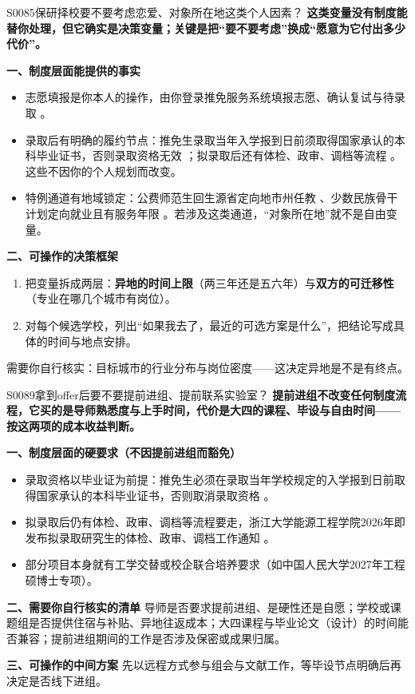 \begin{qa}{S0085}{保研择校要不要考虑恋爱、对象所在地这类个人因素？}
\textbf{这类变量没有制度能替你处理，但它确实是决策变量；关键是把“要不要考虑”换成“愿意为它付出多少代价”。}

\textbf{一、制度层面能提供的事实}
\begin{itemize}
  \item 志愿填报是你本人的操作，由你登录推免服务系统填报志愿、确认复试与待录取 。
  \item 录取后有明确的履约节点：推免生录取当年入学报到日前须取得国家承认的本科毕业证书，否则录取资格无效 ；拟录取后还有体检、政审、调档等流程 。这些不因你的个人规划而改变。
  \item 特例通道有地域锁定：公费师范生回生源省定向地市州任教 、少数民族骨干计划定向就业且有服务年限 。若涉及这类通道，“对象所在地”就不是自由变量。
\end{itemize}

\textbf{二、可操作的决策框架}
\begin{enumerate}
  \item 把变量拆成两层：\textbf{异地的时间上限}（两三年还是五六年）与\textbf{双方的可迁移性}（专业在哪几个城市有岗位）。
  \item 对每个候选学校，列出“如果我去了，最近的可选方案是什么”，把结论写成具体的时间与地点安排。
\end{enumerate}

需要你自行核实：目标城市的行业分布与岗位密度——这决定异地是不是有终点。
\end{qa}

\begin{qa}{S0089}{拿到offer后要不要提前进组、提前联系实验室？}
\textbf{提前进组不改变任何制度流程，它买的是导师熟悉度与上手时间，代价是大四的课程、毕设与自由时间——按这两项的成本收益判断。}

\textbf{一、制度层面的硬要求（不因提前进组而豁免）}
\begin{itemize}
  \item 录取资格以毕业证为前提：推免生必须在录取当年学校规定的入学报到日前取得国家承认的本科毕业证书，否则取消录取资格 。
  \item 拟录取后仍有体检、政审、调档等流程要走，浙江大学能源工程学院2026年即发布拟录取研究生的体检、政审、调档工作通知 。
  \item 部分项目本身就有工学交替或校企联合培养要求（如中国人民大学2027年工程硕博士专项）。
\end{itemize}

\textbf{二、需要你自行核实的清单}
导师是否要求提前进组、是硬性还是自愿；学校或课题组是否提供住宿与补贴、异地往返成本；大四课程与毕业论文（设计）的时间能否兼容；提前进组期间的工作是否涉及保密或成果归属。

\textbf{三、可操作的中间方案}
先以远程方式参与组会与文献工作，等毕设节点明确后再决定是否线下进组。
\end{qa}

